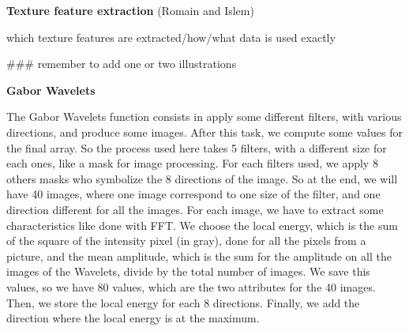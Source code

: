 \textbf{Texture feature extraction} (Romain and Islem)

which texture features are extracted/how/what data is used exactly

### remember to add one or two illustrations 

\textbf{Gabor Wavelets}

The Gabor Wavelets function consists in apply some different filters, with various directions, and produce some images. After this task, we compute some values for the final array. So the process used here takes 5 filters, with a different size for each ones, like a mask for image processing. For each filters used, we apply 8 others masks who symbolize the 8 directions of the image. So at the end, we will have 40 images, where one image correspond to one size of the filter, and one direction different for all the images. For each image, we have to extract some characteristics like done with FFT. We choose the local energy, which is the sum of the square of the intensity pixel (in gray), done for all the pixels from a picture, and the mean amplitude, which is the sum for the amplitude on all the images of the Wavelets, divide by the total number of images. We save this values, so we have 80 values, which are the two attributes for the 40 images. Then, we store the local energy for each 8 directions. Finally, we add the direction where the local energy is at the maximum.

    
    